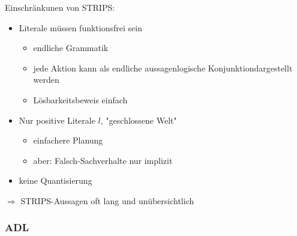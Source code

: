 Einschränkunen von STRIPS:
\begin{itemize}
\item Literale müssen funktionsfrei sein
\begin{itemize}
\item endliche Grammatik
\item jede Aktion kann als endliche aussagenlogische Konjunktiondargestellt werden
\item Lösbarkeitsbeweis einfach
\end{itemize}
\item Nur positive Literale $l$, "{}geschlossene Welt"{}
\begin{itemize}
\item einfachere Planung
\item aber: Falsch-Sachverhalte nur implizit
\end{itemize}
\item keine Quantisierung
\end{itemize}
$\Rightarrow$ STRIPS-Aussagen oft lang und unübersichtlich

\subsubsection*{ADL}

